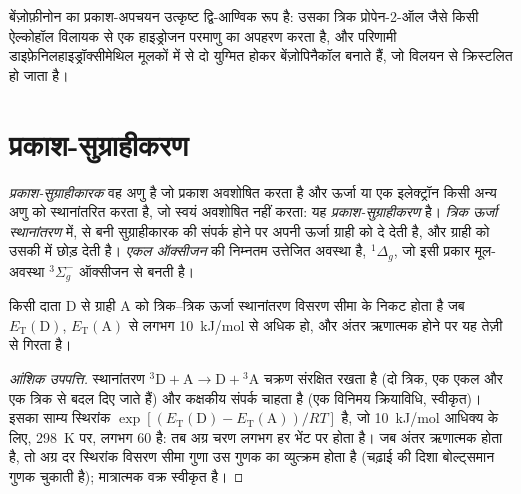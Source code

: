 बेंज़ोफ़ीनोन का प्रकाश-अपचयन उत्कृष्ट द्वि-आण्विक रूप है: उसका
त्रिक प्रोपेन-2-ऑल जैसे किसी ऐल्कोहॉल विलायक से एक हाइड्रोजन परमाणु का अपहरण करता है,
और परिणामी डाइफ़ेनिलहाइड्रॉक्सीमेथिल मूलकों में से दो युग्मित होकर बेंज़ोपिनैकॉल बनाते हैं,
जो विलयन से क्रिस्टलित हो जाता है।

\section{प्रकाश-सुग्राहीकरण}

\begin{definition}\label{def:b3:photochemistry:sensitisation}
\emph{प्रकाश-सुग्राहीकारक} वह अणु है जो प्रकाश अवशोषित करता है
और ऊर्जा या एक इलेक्ट्रॉन किसी अन्य अणु को स्थानांतरित करता है, जो स्वयं
अवशोषित नहीं करता: यह \emph{प्रकाश-सुग्राहीकरण} है।
\emph{त्रिक ऊर्जा स्थानांतरण} में,  से बनी
सुग्राहीकारक की  संपर्क होने पर अपनी ऊर्जा ग्राही को दे देती है, और
ग्राही को उसकी  में छोड़ देती है। \emph{एकल
ऑक्सीजन}  की निम्नतम उत्तेजित अवस्था है,
${}^1\Delta_g$, जो इसी प्रकार मूल-अवस्था ${}^3\Sigma_g^-$ ऑक्सीजन से बनती है।
\end{definition}

\begin{proposition}[त्रिक स्थानांतरण की ऊर्जा शर्त]\label{prop:b3:photochemistry:sensitisation-condition}
किसी दाता D से ग्राही A को त्रिक--त्रिक ऊर्जा स्थानांतरण विसरण सीमा के निकट होता है
जब $E_{\mathrm T}(\mathrm D)$, $E_{\mathrm T}(\mathrm A)$ से लगभग \qty{10}{kJ/mol} से अधिक हो, और
अंतर ऋणात्मक होने पर यह तेज़ी से गिरता है।
\end{proposition}

\begin{proof}[आंशिक उपपत्ति]
स्थानांतरण ${}^3\mathrm D + \mathrm A \to \mathrm D + {}^3\mathrm A$ चक्रण संरक्षित रखता है (दो त्रिक, एक
एकल और एक त्रिक से बदल दिए जाते हैं) और कक्षकीय संपर्क चाहता है (एक विनिमय क्रियाविधि,
स्वीकृत)। इसका साम्य स्थिरांक $\exp[(E_{\mathrm T}(\mathrm D) - E_{\mathrm T}(\mathrm A))/RT]$ है, जो
\qty{10}{kJ/mol} आधिक्य के लिए, \qty{298}{K} पर, लगभग 60 है: तब अग्र चरण लगभग हर
भेंट पर होता है। जब अंतर ऋणात्मक होता है, तो अग्र दर स्थिरांक
विसरण सीमा गुणा उस गुणक का व्युत्क्रम होता है (चढ़ाई की दिशा
बोल्ट्समान गुणक चुकाती है); मात्रात्मक वक्र स्वीकृत है।
\end{proof}

